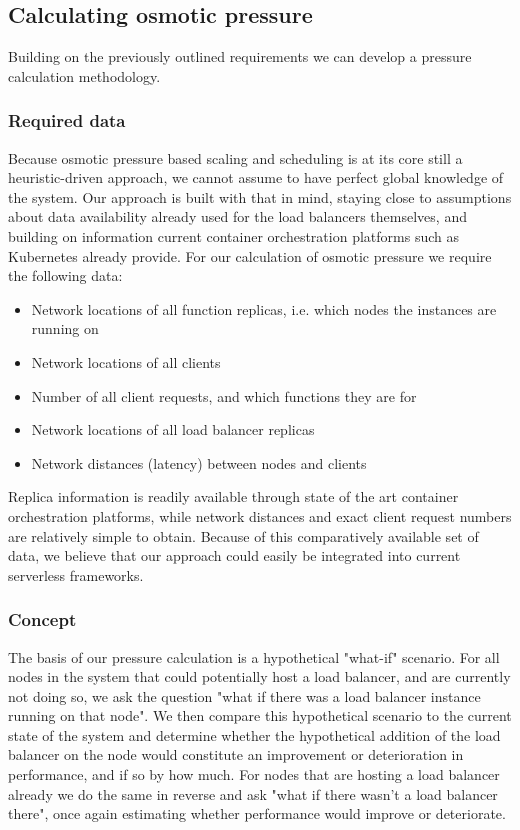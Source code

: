 \documentclass[draft,final]{vutinfth} %
\begin{document}
\subsection{Calculating osmotic pressure}
Building on the previously outlined requirements we can develop a pressure calculation methodology.
\subsubsection{Required data}
Because osmotic pressure based scaling and scheduling is at its core still a heuristic-driven approach, we cannot assume to have perfect global knowledge of the system.
Our approach is built with that in mind, staying close to assumptions about data availability already used for the load balancers themselves, and building on information current container orchestration platforms such as Kubernetes already provide.
For our calculation of osmotic pressure we require the following data:
\begin{itemize}
    \item Network locations of all function replicas, i.e. which nodes the instances are running on
    \item Network locations of all clients
    \item Number of all client requests, and which functions they are for
    \item Network locations of all load balancer replicas
    \item Network distances (latency) between nodes and clients
\end{itemize}
Replica information is readily available through state of the art container orchestration platforms, while network distances and exact client request numbers are relatively simple to obtain.
Because of this comparatively available set of data, we believe that our approach could easily be integrated into current serverless frameworks.
\subsubsection{Concept}
The basis of our pressure calculation is a hypothetical "what-if" scenario.
For all nodes in the system that could potentially host a load balancer, and are currently not doing so, we ask the question "what if there was a load balancer instance running on that node".
We then compare this hypothetical scenario to the current state of the system and determine whether the hypothetical addition of the load balancer on the node would constitute an improvement or deterioration in performance, and if so by how much.
For nodes that are hosting a load balancer already we do the same in reverse and ask "what if there wasn't a load balancer there", once again estimating whether performance would improve or deteriorate.
\end{document}
